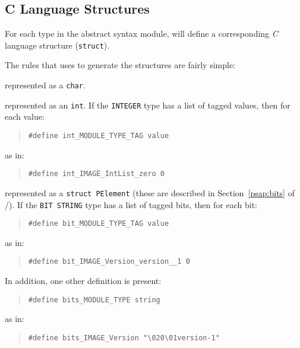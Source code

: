 \subsection	{C Language Structures}\label{posy:c-struct}
For each type in the abstract syntax module,
 will define a corresponding {\em C\/} language structure
(\verb"struct").

The rules that  uses to generate the structures are fairly simple:
\begin{describe}
\item	[\verb"BOOLEAN":] represented as a \verb"char".

\item	[\verb"INTEGER":] represented as an \verb"int".
	If the \verb"INTEGER" type has a list of tagged values,
	then for each value:
\begin{quote}\small\begin{verbatim}
#define int_MODULE_TYPE_TAG value
\end{verbatim}\end{quote}
	as in:
\begin{quote}\small\begin{verbatim}
#define int_IMAGE_IntList_zero 0
\end{verbatim}\end{quote}

\item	[\verb"BIT STRING":] represented as a \verb"struct PElement"
	(these are described in Section~\ref{psap:bits} of \volone/).
	If the \verb"BIT STRING" type has a list of tagged bits,
	then for each bit:
\begin{quote}\small\begin{verbatim}
#define bit_MODULE_TYPE_TAG value
\end{verbatim}\end{quote}
	as in:
\begin{quote}\small\begin{verbatim}
#define bit_IMAGE_Version_version__1 0
\end{verbatim}\end{quote}
	In addition, one other definition is present:
\begin{quote}\small\begin{verbatim}
#define bits_MODULE_TYPE string
\end{verbatim}\end{quote}
	as in:
\begin{quote}\small\begin{verbatim}
#define bits_IMAGE_Version "\020\01version-1"
\end{verbatim}\end{quote}


\end{describe}
